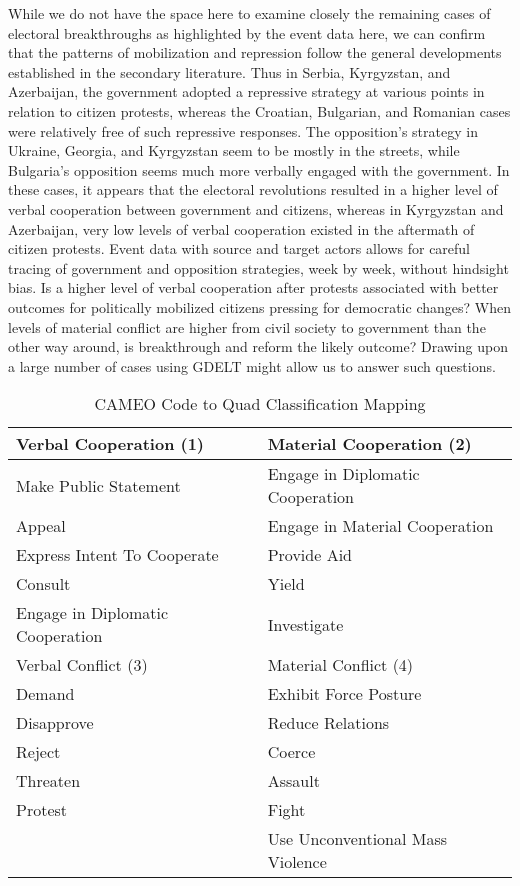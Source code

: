 \documentclass[10pt]{article}
\begin{document}
While we do not have the space here to examine closely the remaining cases of electoral breakthroughs as highlighted by the event data here, we can confirm that the patterns of mobilization and repression follow the general developments established in the secondary literature.   Thus in Serbia, Kyrgyzstan, and Azerbaijan, the government adopted a repressive strategy at various points in relation to citizen protests, whereas the Croatian, Bulgarian, and Romanian cases were relatively free of such repressive responses. The opposition's strategy in Ukraine, Georgia, and Kyrgyzstan seem to be mostly in the streets, while Bulgaria's opposition seems much more verbally engaged with the government.  In these cases, it appears that the electoral revolutions resulted in a higher level of verbal cooperation between government and citizens, whereas in Kyrgyzstan and Azerbaijan, very low levels of verbal cooperation existed in the aftermath of citizen protests.   Event data with source and target actors allows for careful tracing of government and opposition strategies, week by week, without hindsight bias. Is a higher level of verbal cooperation after protests associated with better outcomes for politically mobilized citizens pressing for democratic changes?   When levels of material conflict are higher from civil society to government than the other way around, is breakthrough and reform the likely outcome?   Drawing upon a large number of cases using GDELT might allow us to answer such questions.         	


\begin{table*}[ht]
\begin{center}
\caption{CAMEO Code to Quad Classification Mapping}
\vspace{8pt}
\begin{tabular}{ l l }
 Verbal Cooperation (1) & Material Cooperation (2)  \\ \hline
 Make Public Statement & Engage in Diplomatic Cooperation  \\
 Appeal & Engage in Material Cooperation \\
 Express Intent To Cooperate & Provide Aid  \\
 Consult & Yield  \\
  Engage in Diplomatic Cooperation & Investigate \\[12pt]
 
 Verbal Conflict (3) & Material Conflict (4) \\ \hline
 Demand & Exhibit Force Posture \\
 Disapprove & Reduce Relations \\
 Reject & Coerce  \\
 Threaten & Assault  \\
 Protest & Fight \\
  & Use Unconventional Mass Violence \\
\end{tabular}
\end{center}
\end{table*}
\end{document}

